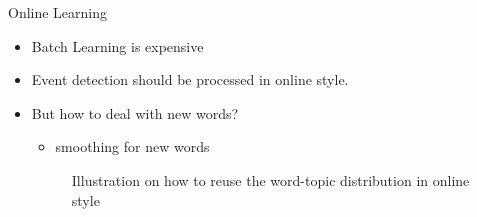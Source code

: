 \documentclass{beamer}
\begin{document}
\begin{frame}
\begin{columns}[T]
\begin{column}{.46\textwidth}
\parbox[t][1200mm]{\textwidth}{
\begin{block}{Online Learning}
\begin{itemize}
\item Batch Learning is expensive
\item Event detection should be processed in online style.
\item But how to deal with new words? 
        \begin{itemize}
                \item smoothing for new words
        \end{itemize}
\begin{figure}[H]
        \centering
        \label{fig:subfig} %
         \hspace{1in}
        \caption{\footnotesize{Illustration on how to reuse the word-topic distribution in online style}}
\end{figure}

\end{itemize}
\end{block}

}
\end{column}
\end{columns}
\end{frame}
\end{document}
